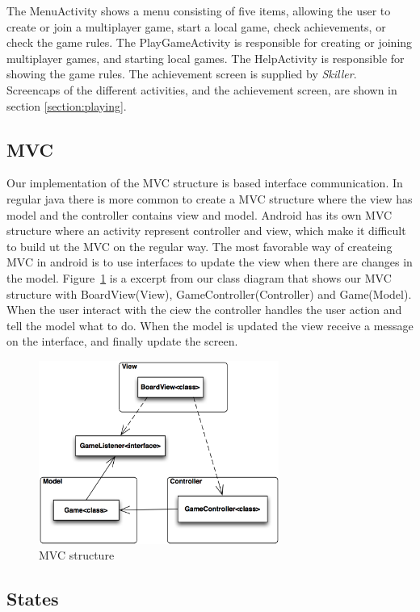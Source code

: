 The MenuActivity shows a menu consisting of five items, allowing the user to create or join a multiplayer game, start a local game, check achievements, or check the game rules. The PlayGameActivity is responsible for creating or joining multiplayer games, and starting local games. The HelpActivity is responsible for showing the game rules. The achievement screen is supplied by \emph{Skiller}.\\

Screencaps of the different activities, and the achievement screen, are shown in section \ref{section:playing}.

\subsection{MVC}

Our implementation of the MVC structure is based interface communication. In regular java there is more common to create a MVC structure where the view has model and the controller contains view and model. Android has its own MVC structure where an activity represent controller and view, which make it difficult to build ut the MVC on the regular way. The most favorable way of createing MVC in android is to use interfaces to update the view when there are changes in the model. Figure~\ref{fig:mvc} is a excerpt from our class diagram that shows our MVC structure with BoardView(View), GameController(Controller) and Game(Model). When the user interact with the ciew the controller handles the user action and tell the model what to do. When the model is updated the view receive a message on the interface, and finally update the screen.

\begin{figure}[H]
\begin{center}
\includegraphics[width=0.7\textwidth]{Images/mvc}
\caption{MVC structure}
\label{fig:mvc}
\end{center}
\end{figure}

\subsection{States}







